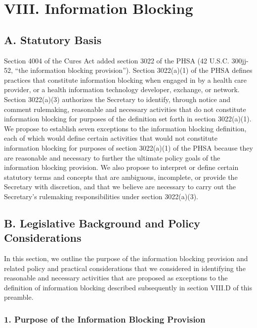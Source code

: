 \documentclass[twoside,11pt]{article}
\begin{document}
          \section{VIII. Information Blocking}

          \subsection{A. Statutory Basis}

          Section 4004 of the Cures Act added section 3022 of the PHSA (42 U.S.C. 300jj-52, “the information blocking provision”). Section 3022(a)(1) of the PHSA defines practices that constitute information blocking when engaged in by a health care provider, or a health information technology developer, exchange, or network. Section 3022(a)(3) authorizes the Secretary to identify, through notice and comment rulemaking, reasonable and necessary activities that do not constitute information blocking for purposes of the definition set forth in section 3022(a)(1). We propose to establish seven exceptions to the information blocking definition, each of which would define certain activities that would not constitute information blocking for purposes of section 3022(a)(1) of the PHSA because they are reasonable and necessary to further the ultimate policy goals of the information blocking provision. We also propose to interpret or define certain statutory terms and concepts that are ambiguous, incomplete, or provide the Secretary with discretion, and that we believe are necessary to carry out the Secretary's rulemaking responsibilities under section 3022(a)(3).


          \subsection{B. Legislative Background and Policy Considerations}

          In this section, we outline the purpose of the information blocking provision and related policy and practical considerations that we considered in identifying the reasonable and necessary activities that are proposed as exceptions to the definition of information blocking described subsequently in section VIII.D of this preamble.


          \subsubsection{1. Purpose of the Information Blocking Provision}
\end{document}
